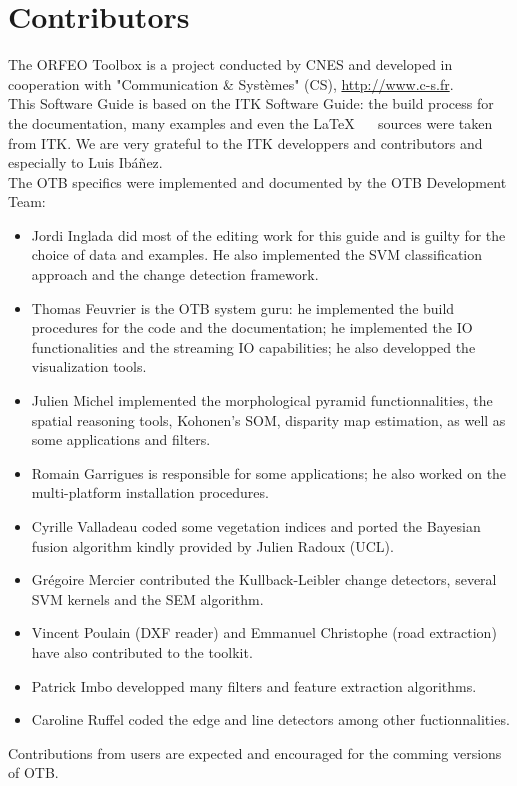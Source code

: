 \chapter*{Contributors}
\noindent

The ORFEO Toolbox is a project conducted by CNES and developed in
cooperation with "Communication \&
  Syst\`{e}mes" (CS), \url{http://www.c-s.fr}.\\

This Software Guide is based on the ITK Software Guide: the build
process for the documentation, many examples and even the \LaTeX~ ~
sources were taken from ITK. We are very grateful to the ITK
developpers and contributors and especially to Luis Ib\'a\~nez.\\

The OTB specifics were implemented and documented by the OTB Development Team:
\begin{itemize}
  \item Jordi Inglada did most of the editing work for this guide and
  is guilty for the choice of data and examples. He also implemented
  the SVM classification approach and the change detection framework.
  \item Thomas Feuvrier is the OTB system guru: he implemented the
  build procedures for the code and the documentation; he implemented
  the IO functionalities and the streaming IO capabilities; he also
  developped the visualization tools.
  \item Julien Michel implemented the morphological pyramid
  functionnalities, the spatial reasoning tools, Kohonen's SOM,
  disparity map estimation, as
  well as some applications and filters.
\item Romain Garrigues is responsible for some applications; he also
  worked on the multi-platform installation procedures.
  \item Cyrille Valladeau coded some vegetation indices and ported the
  Bayesian fusion algorithm kindly provided by Julien Radoux (UCL).
  \item Gr\'egoire Mercier contributed the Kullback-Leibler change
  detectors, several SVM kernels and the SEM algorithm.
  \item Vincent Poulain (DXF reader) and Emmanuel Christophe (road
  extraction) have also contributed to the toolkit.
  \item Patrick Imbo developped many filters and feature
  extraction algorithms.
  \item Caroline Ruffel coded the edge and line detectors among other
  fuctionnalities.



\end{itemize}

Contributions from users are expected and encouraged for the comming
versions of OTB.

